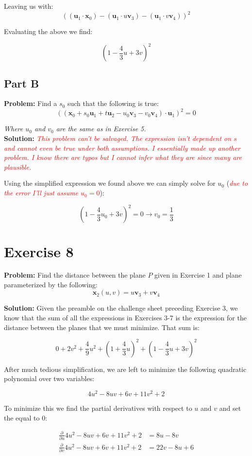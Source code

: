 \documentclass{article}
\begin{document}
Leaving us with:
$$((\mathbf u_1\cdot\mathbf x_0)-(\mathbf u_1\cdot u\mathbf v_3)-(\mathbf u_1\cdot v\mathbf v_4))^2$$

Evaluating the above we find:

$$\left(1-\frac{4}{3}u+3v\right)^2$$

\subsection*{Part B}
\textbf{Problem:} Find a $s_0$ such that the following is true:
$$((\mathbf x_0+s_0\mathbf u_1+t\mathbf u_2-u_0\mathbf v_3-v_0\mathbf v_4)\cdot\mathbf u_1)^2=0$$

\textit{Where $u_0$ and $v_0$ are the same as in Exercise 5.}
\\
\textbf{Solution:} \textit{\textcolor{red}{This problem can't be salvaged. The expression isn't dependent on $s$ and cannot even be true under both assumptions. I essentially made up another problem. I know there are typos but I cannot infer what they are since many are plausible.}}

Using the simplified expression we found above we can simply solve for $u_0$ (\textit{\textcolor{red}{due to the error I'll just assume $u_0=0$}}):

$$\left(1-\frac{4}{3}u_0+3v\right)^2=0\rightarrow \boxed{v_0=\frac{1}{3}}$$

\section*{Exercise 8}
\textbf{Problem:} Find the distance between the plane $P$ given in Exercise 1 and plane parameterized by the following:
$$\mathbf x_2(u,v)=u\mathbf v_3+v\mathbf v_4$$

\textbf{Solution:} Given the preamble on the challenge sheet preceding Exercise 3, we know that the sum of all the expressions in Exercises 3-7 is the expression for the distance between the planes that we must minimize. That sum is:

$$0+2v^2+\frac{4}{9}u^2+\left(1+\frac{4}{3}u\right)^2+\left(1-\frac{4}{3}u+3v\right)^2$$

After much tedious simplification, we are left to minimize the following quadratic polynomial over two variables:

$$4u^2-8uv+6v+11v^2+2$$

To minimize this we find the partial derivatives with respect to $u$ and $v$ and set the equal to 0:

\begin{align*}
  \frac{\partial}{\partial u}4u^2-8uv+6v+11v^2+2&=8u-8v\\
  \frac{\partial}{\partial v}4u^2-8uv+6v+11v^2+2&=22v-8u+6\\
\end{align*}
\end{document}
